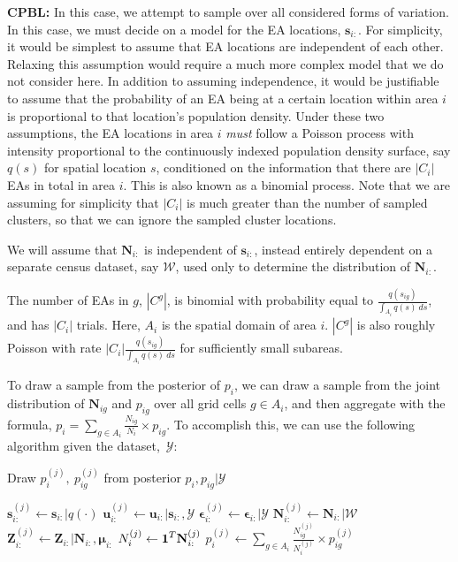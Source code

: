 \documentclass[12pt]{article}
\newcommand{\bmone}{\mbox{\bf 1}}
\begin{document}
\medskip
\noindent
\textbf{CPBL:} In this case, we attempt to sample over all considered forms of variation. In this case, we must decide on a model for the EA locations, $\boldsymbol{s}_{i:}$. For simplicity, it would be simplest to assume that EA locations are independent of each other. Relaxing this assumption would require a much more complex model that we do not consider here. In addition to assuming independence, it would be justifiable to assume that the probability of an EA being at a certain location within area $i$ is proportional to that location's population density. Under these two assumptions, the EA locations in area $i$ \textit{must} follow a Poisson process with intensity proportional to the continuously indexed population density surface, say $q(s)$ for spatial location $s$, conditioned on the information that there are $|C_i|$ EAs in total in area $i$. This is also known as a binomial process. Note that we are assuming for simplicity that $|C_i|$ is much greater than the number of sampled clusters, so that we can ignore the sampled cluster locations.

We will assume that $\boldsymbol{N}_{i:}$ is independent of $\mathbf{s}_{i:}$, instead entirely dependent on a separate census dataset, say $\mathscr{W}$, used only to determine the distribution of $\boldsymbol{N}_{i:}$.

The number of EAs in $g$, $|C^g|$, is binomial with probability equal to $\frac{q(s_{ig})}{\int_{A_i} q(s) \ ds}$, and has $|C_i|$ trials. Here, $A_i$ is the spatial domain of area $i$.  $|C^g|$ is also roughly Poisson with rate $|C_i| \frac{q(s_{ig})}{\int_{A_i} q(s) \ ds}$ for sufficiently small subareas.

To draw a sample from the posterior of $p_i$, we can draw a sample from the joint distribution of $\boldsymbol{N}_{ig}$ and $p_{ig}$ over all grid cells $g \in A_i$, and then aggregate with the formula, $p_i = \sum_{g \in A_i} \frac{N_{ig}}{N_{i}} \times p_{ig}$. To accomplish this, we can use the following algorithm given the dataset,~$\mathscr{Y}$:

\begin{algorithm}[H]
\caption{Draw $p_i^{(j)}, \ p_{ig}^{(j)}$ from posterior $p_i, p_{ig} \vert  \mathscr{Y}$}
\label{alg:main}
\begin{algorithmic}[1]
\STATE $\mathbf{s}_{i:}^{(j)}\leftarrow \mathbf{s}_{i:} \vert q( \cdot )$
\STATE $\boldsymbol{u}_{i:}^{(j)} \leftarrow \boldsymbol{u}_{i:} \vert \mathbf{s}_{i:}, \mathscr{Y}$
\STATE $\boldsymbol{ \epsilon }_{i:}^{(j)} \leftarrow \boldsymbol{ \epsilon }_{i:}  \vert  \mathscr{Y} $
\STATE $\mathbf{N}_{i:}^{(j)} \leftarrow \mathbf{N}_{i:} \vert \mathscr{W}$
\STATE $\mathbf{Z}_{i:}^{(j)} \leftarrow \mathbf{Z}_{i:} \vert \mathbf{N}_{i:}, \boldsymbol{\mu}_{i:}$
\STATE $N_i^{(j)} \leftarrow \bmone^T \mathbf{N}_{i:}^{(j)}$
\ENDFOR
\STATE $p_i^{(j)} \leftarrow  \sum_{g \in A_i} \frac{N_{ig}^{(j)}}{N_{i}^{(j)}} \times p_{ig}^{(j)}$
\end{algorithmic}
\end{algorithm}
\end{document}
